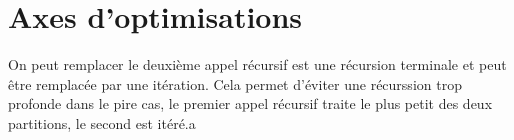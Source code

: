 \documentclass[a4paper]{article}
\begin{document}
\section{Axes d'optimisations}
On peut remplacer le deuxième appel récursif est une récursion terminale et peut être remplacée par une itération. 
Cela permet d'éviter une récurssion trop profonde dans le pire cas, le premier appel récursif traite le plus petit des deux partitions, le second est itéré.a 
\end{document}
